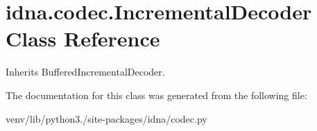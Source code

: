\hypertarget{classidna_1_1codec_1_1_incremental_decoder}{}\section{idna.\+codec.\+Incremental\+Decoder Class Reference}
\label{classidna_1_1codec_1_1_incremental_decoder}


Inherits Buffered\+Incremental\+Decoder.



The documentation for this class was generated from the following file\+:\begin{DoxyCompactItemize}
\item 
venv/lib/python3./site-\/packages/idna/codec.\+py\end{DoxyCompactItemize}
